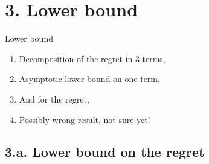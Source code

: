 \documentclass[12pt,english,ignorenonframetext,]{beamer}
\providecommand{\tightlist}{%
  \setlength{\itemsep}{0pt}\setlength{\parskip}{0pt}}
\begin{document}
\section{\hfill{}3. Lower bound\hfill{}}

\begin{frame}{Lower bound}

\begin{enumerate}
\def\labelenumi{\arabic{enumi}.}
\tightlist
\item
  Decomposition of the regret in \(3\) terms,\vspace*{15pt}
\item
  Asymptotic lower bound on one term,\vspace*{15pt}
\item
  And for the regret,\vspace*{15pt}
\item
  \alert{Possibly wrong result, not sure yet!}
\end{enumerate}

\end{frame}



\subsection{\hfill{}3.a. Lower bound on the regret\hfill{}}
\end{document}
